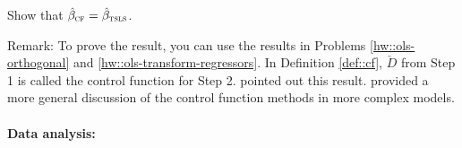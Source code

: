  Show that $\hat{\beta}_\textsc{cf} = \hat{\beta}_\textsc{tsls}$.
 
 
 Remark:
To prove the result, you can use the results in Problems \ref{hw::ols-orthogonal} and \ref{hw::ols-transform-regressors}.  
  In Definition \ref{def::cf}, $\check{D}$ from Step 1 is called the control function for Step 2. 
 \citet{hausman1978specification} pointed out this result. \citet{wooldridge2015control} provided a more general discussion of the control function methods in more complex models. 
 
  


 

%
%
%
%
%


\paragraph{Data analysis: \citet{efron1991compliance}}

